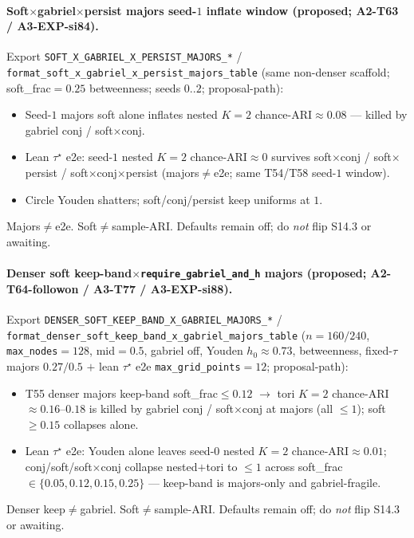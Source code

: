 \documentclass[11pt]{article}
\begin{document}
\paragraph{Soft$\times$gabriel$\times$persist majors seed-$1$ inflate window
(proposed; A2-T63 / A3-EXP-si84).}
Export \texttt{SOFT\_X\_GABRIEL\_X\_PERSIST\_MAJORS\_*} /
\texttt{format\_soft\_x\_gabriel\_x\_persist\_majors\_table}
(same non-denser scaffold; soft\_frac${=}0.25$ betweenness; seeds $0..2$;
proposal-path):
\begin{itemize}[leftmargin=1.5em]
  \item Seed-$1$ majors soft alone inflates nested $K{=}2$
  chance-ARI$\approx 0.08$ --- killed by gabriel conj / soft$\times$conj.
  \item Lean $\tau^\star$ e2e: seed-$1$ nested $K{=}2$ chance-ARI$\approx 0$
  survives soft$\times$conj / soft$\times$persist /
  soft$\times$conj$\times$persist (majors$\neq$e2e; same T54/T58 seed-$1$
  window).
  \item Circle Youden shatters; soft/conj/persist keep uniforms at $1$.
\end{itemize}
Majors$\neq$e2e. Soft$\neq$sample-ARI. Defaults remain off; do
\emph{not} flip S14.3 or awaiting.

\paragraph{Denser soft keep-band$\times$\texttt{require\_gabriel\_and\_h}
majors (proposed; A2-T64-followon / A3-T77 / A3-EXP-si88).}
Export \texttt{DENSER\_SOFT\_KEEP\_BAND\_X\_GABRIEL\_MAJORS\_*} /
\texttt{format\_denser\_soft\_keep\_band\_x\_gabriel\_majors\_table}
($n{=}160/240$, \texttt{max\_nodes}${=}128$, mid${=}0.5$, gabriel off,
Youden $h_0\approx 0.73$, betweenness, fixed-$\tau$ majors $0.27/0.5$ $+$
lean $\tau^\star$ e2e \texttt{max\_grid\_points}${=}12$; proposal-path):
\begin{itemize}[leftmargin=1.5em]
  \item T55 denser majors keep-band soft\_frac$\le 0.12$ $\to$ tori
  $K{=}2$ chance-ARI$\approx 0.16$--$0.18$ is killed by gabriel conj /
  soft$\times$conj at majors (all $\le 1$); soft$\ge 0.15$ collapses
  alone.
  \item Lean $\tau^\star$ e2e: Youden alone leaves seed-$0$ nested
  $K{=}2$ chance-ARI$\approx 0.01$; conj/soft/soft$\times$conj collapse
  nested$+$tori to $\le 1$ across soft\_frac$\in\{0.05,0.12,0.15,0.25\}$
  --- keep-band is majors-only and gabriel-fragile.
\end{itemize}
Denser keep$\neq$gabriel. Soft$\neq$sample-ARI. Defaults remain off; do
\emph{not} flip S14.3 or awaiting.
\end{document}
